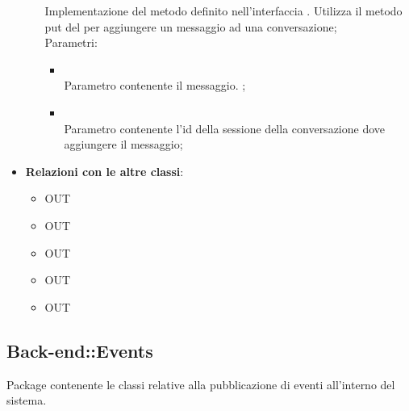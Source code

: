 \begin{itemize}
\begin{itemize}
		Implementazione del metodo definito nell'interfaccia . Utilizza il metodo put del  per aggiungere un messaggio ad una conversazione;\\
		Parametri:
		\begin{itemize}
			\item {} \\
			Parametro contenente il messaggio.
;
			\item {} \\
			Parametro contenente l'id della sessione della conversazione dove aggiungere il messaggio;
		\end{itemize}
	\end{itemize}
	\item \textbf{Relazioni con le altre classi}:
	\begin{itemize}
		\item OUT \hyperlink{<<interface>> ConversationsDAO_label}{}
		\item OUT \hyperlink{ConversationMsg_label}{}
		\item OUT \hyperlink{ConversationObservable_label}{}
		\item OUT \hyperlink{Conversation_label}{}
		\item OUT \hyperlink{ErrorObservable_label}{}
	\end{itemize}
\end{itemize}
\FloatBarrier

\subsection{Back-end::Events}
Package contenente le classi relative alla pubblicazione di eventi all'interno del sistema.
